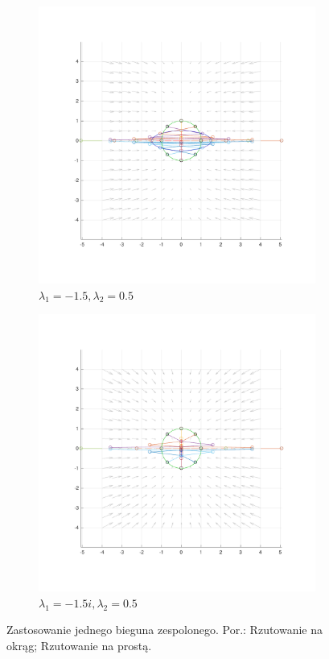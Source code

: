 \documentclass[]{article}
\begin{document}
\begin{figure}
	\centering
	\begin{subfigure}{.5\textwidth}
		\centering
		\includegraphics[width=0.99\linewidth]{imag_0-15_05}
		\caption{$\lambda_1 = -1.5, \lambda_2 = 0.5$}
		\label{fig:imag1}
	\end{subfigure}%
	\begin{subfigure}{.5\textwidth}
		\centering
		\includegraphics[width=0.99\linewidth]{imag_0-15i_05}
		\caption{$\lambda_1 = -1.5i, \lambda_2 = 0.5$}
		\label{fig:imag2}
	\end{subfigure}
	\caption{Zastosowanie jednego bieguna zespolonego. Por.: Rzutowanie na okrąg; Rzutowanie na prostą.}
	\label{fig3}
\end{figure}
\end{document}
